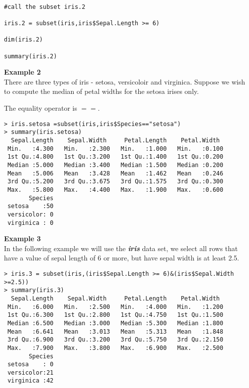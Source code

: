 \documentclass[12pt]{article}
\begin{document}
\begin{framed}
\begin{verbatim}

#call the subset iris.2

iris.2 = subset(iris,iris$Sepal.Length >= 6)

dim(iris.2)

summary(iris.2)

\end{verbatim}
\end{framed}

\newpage
\noindent \textbf{Example 2} \\
There are three types of iris - setosa, versicoloir and virginica. Suppose we wish to compute the median of petal widths for the setosa irises only.

The equality operator is $==$.
\begin{verbatim}
> iris.setosa =subset(iris,iris$Species=="setosa")
> summary(iris.setosa)
  Sepal.Length    Sepal.Width     Petal.Length    Petal.Width   
 Min.   :4.300   Min.   :2.300   Min.   :1.000   Min.   :0.100  
 1st Qu.:4.800   1st Qu.:3.200   1st Qu.:1.400   1st Qu.:0.200  
 Median :5.000   Median :3.400   Median :1.500   Median :0.200  
 Mean   :5.006   Mean   :3.428   Mean   :1.462   Mean   :0.246  
 3rd Qu.:5.200   3rd Qu.:3.675   3rd Qu.:1.575   3rd Qu.:0.300  
 Max.   :5.800   Max.   :4.400   Max.   :1.900   Max.   :0.600  
       Species  
 setosa    :50  
 versicolor: 0  
 virginica : 0 
\end{verbatim} 
 
\noindent \textbf{Example 3} \\
In the following example we will use the \textit{\textbf{iris}} data set, we select all rows that have a value of sepal length of 6 or more, but have sepal width is at least 2.5.

\begin{verbatim}
> iris.3 = subset(iris,(iris$Sepal.Length >= 6)&(iris$Sepal.Width >=2.5))
> summary(iris.3)
  Sepal.Length    Sepal.Width     Petal.Length    Petal.Width   
 Min.   :6.000   Min.   :2.500   Min.   :4.000   Min.   :1.200  
 1st Qu.:6.300   1st Qu.:2.800   1st Qu.:4.750   1st Qu.:1.500  
 Median :6.500   Median :3.000   Median :5.300   Median :1.800  
 Mean   :6.641   Mean   :3.013   Mean   :5.313   Mean   :1.848  
 3rd Qu.:6.900   3rd Qu.:3.200   3rd Qu.:5.750   3rd Qu.:2.150  
 Max.   :7.900   Max.   :3.800   Max.   :6.900   Max.   :2.500  
       Species  
 setosa    : 0  
 versicolor:21  
 virginica :42  
\end{verbatim}
\end{document}
